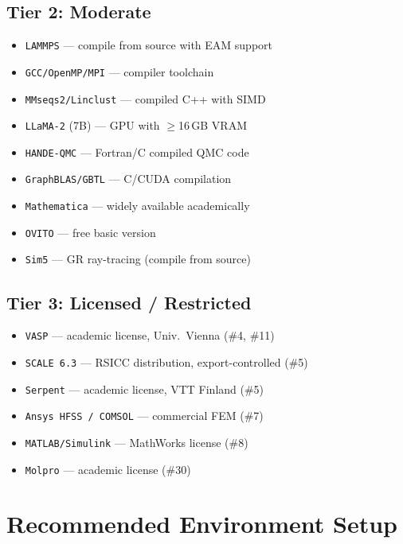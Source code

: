 \documentclass[11pt,letterpaper]{article}
\newcommand{\tool}[1]{\texttt{#1}}
\begin{document}
\subsection{Tier 2: Moderate}
\begin{itemize}[nosep]
\item \tool{LAMMPS} --- compile from source with EAM support
\item \tool{GCC/OpenMP/MPI} --- compiler toolchain
\item \tool{MMseqs2/Linclust} --- compiled C++ with SIMD
\item \tool{LLaMA-2} (7B) --- GPU with $\geq$16\,GB VRAM
\item \tool{HANDE-QMC} --- Fortran/C compiled QMC code
\item \tool{GraphBLAS/GBTL} --- C/CUDA compilation
\item \tool{Mathematica} --- widely available academically
\item \tool{OVITO} --- free basic version
\item \tool{Sim5} --- GR ray-tracing (compile from source)
\end{itemize}

\subsection{Tier 3: Licensed / Restricted}
\begin{itemize}[nosep]
\item \tool{VASP} --- academic license, Univ.\ Vienna (\#4, \#11)
\item \tool{SCALE 6.3} --- RSICC distribution, export-controlled (\#5)
\item \tool{Serpent} --- academic license, VTT Finland (\#5)
\item \tool{Ansys HFSS / COMSOL} --- commercial FEM (\#7)
\item \tool{MATLAB/Simulink} --- MathWorks license (\#8)
\item \tool{Molpro} --- academic license (\#30)
\end{itemize}

\section{Recommended Environment Setup}
\end{document}
